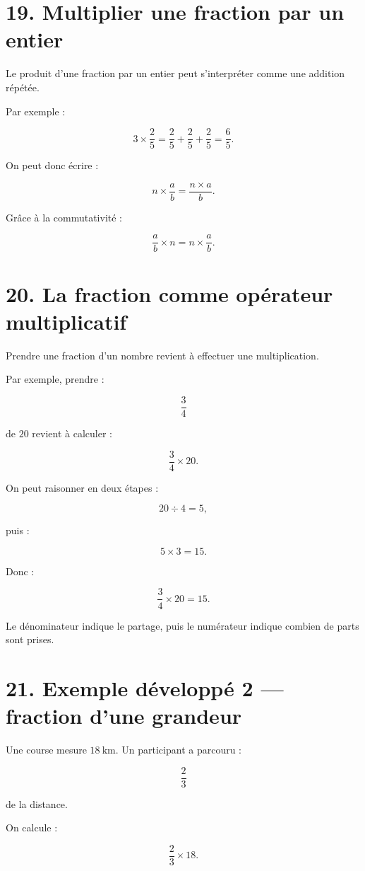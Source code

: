 \section{19. Multiplier une fraction par un entier}

Le produit d’une fraction par un entier peut s’interpréter comme une addition répétée.

Par exemple :

\[
3\times\dfrac{2}{5}
=
\dfrac{2}{5}+\dfrac{2}{5}+\dfrac{2}{5}
=
\dfrac{6}{5}.
\]

On peut donc écrire :

\[
\boxed{
n\times\dfrac{a}{b}
=
\dfrac{n\times a}{b}
}.
\]

Grâce à la commutativité :

\[
\dfrac{a}{b}\times n
=
n\times\dfrac{a}{b}.
\]

\section{20. La fraction comme opérateur multiplicatif}

Prendre une fraction d’un nombre revient à effectuer une multiplication.

Par exemple, prendre :

\[
\dfrac{3}{4}
\]

de $20$ revient à calculer :

\[
\dfrac{3}{4}\times20.
\]

On peut raisonner en deux étapes :

\[
20\div4=5,
\]

puis :

\[
5\times3=15.
\]

Donc :

\[
\boxed{
\dfrac{3}{4}\times20=15
}.
\]

Le dénominateur indique le partage, puis le numérateur indique combien de parts sont prises.

\section{21. Exemple développé 2 — fraction d’une grandeur}

Une course mesure $18\ \text{km}$. Un participant a parcouru :

\[
\dfrac{2}{3}
\]

de la distance.

On calcule :

\[
\dfrac{2}{3}\times18.
\]

